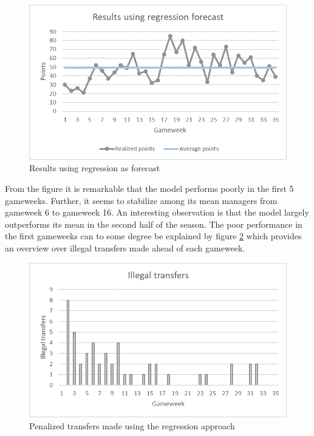 \begin{figure}[H]
    \centering
    \includegraphics[scale=0.75]{fig/chapter_7/Regression_results.png}
    \caption{Results using regression as forecast}
\label{Regression_results}    
\end{figure}

From the figure it is remarkable that the model performs poorly in the first 5 gameweeks. Further, it seems to stabilize among its mean managers from gameweek 6 to gameweek 16. An interesting observation is that the model largely outperforms its mean in the second half of the season. The poor performance in the first gameweeks can to some degree be explained by figure \ref{Transfers_regression} which provides an overview over illegal transfers made ahead of each gameweek.

\begin{figure}[H]
    \centering
    \includegraphics[scale=0.75]{fig/chapter_7/Transfers_regression.png}
    \caption{Penalized transfers made using the regression approach}
\label{Transfers_regression}    
\end{figure}

